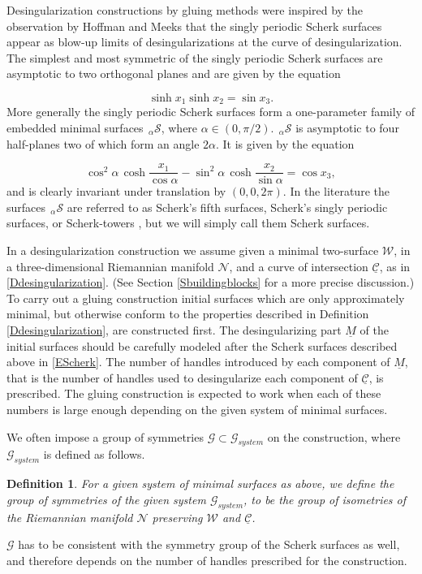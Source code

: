 \documentclass[12pt,namelimits,sumlimits]{amsart}
\newtheorem{definition}[theorem]{Definition}
\theoremstyle{remark}
\numberwithin{equation}{section}
\begin{document}
Desingularization constructions by gluing methods were
inspired by the observation by Hoffman and Meeks \cite{HM4}
that the singly periodic Scherk surfaces \cite{S,DHKW,Ni}
appear as blow-up limits of desingularizations at the curve of desingularization.
The simplest and most symmetric of the singly periodic Scherk surfaces are asymptotic to
two orthogonal planes and are given by the equation
\addtocounter{theorem}{1}
\begin{equation}
\label{EScherkortho}
\sinh x_1 \sinh x_2=\sin x_3.
\end{equation}
More generally the singly periodic Scherk surfaces form 
a one-parameter family of embedded minimal surfaces
${{{}_{\,\alpha\!}\mathcal{S}}}$,
where 
$\alpha\in(0,\pi/2)$.
${{{}_{\,\alpha\!}\mathcal{S}}}$
is asymptotic to four half-planes two of which form an angle $2\alpha$.
It is given \cite{Ni} by the equation 
\addtocounter{theorem}{1}
\begin{equation}
\label{EScherk}
\cos^2\!\alpha\,\cosh\frac {x_1}{\cos\!\alpha}
-
\sin^2\!\alpha\,\cosh\frac {x_2}{\sin\!\alpha}
=\cos x_3,
\end{equation}
and is clearly invariant under translation by $(0,0,2\pi)$.
In the literature the surfaces ${{{}_{\,\alpha\!}\mathcal{S}}}$
are referred to as Scherk's fifth surfaces,
Scherk's singly periodic surfaces,
or Scherk-towers
\cite{Ni,HM4,DHKW,kapouleas:finite}, but
we will simply call them Scherk surfaces.

In a desingularization construction we assume given 
a minimal two-surface ${{\mathcal{W}}}$,
in a three-dimensional Riemannian manifold ${{\mathcal{N}}}$,
and a curve of intersection ${\underline{{\mathcal{C}}}}$,
as in \ref{Ddesingularization}.
(See Section \ref{Sbuildingblocks} for a more precise discussion.)
To carry out a gluing construction initial surfaces which are only approximately minimal,
but otherwise conform to the properties described in Definition \ref{Ddesingularization},
are constructed first.
The desingularizing part $\underline{M}$ of the initial surfaces should be carefully modeled
after the Scherk surfaces described above in \ref{EScherk}.
The number of handles introduced by each component of $\underline{M}$,
that is the number of handles used to desingularize each component of ${\underline{{\mathcal{C}}}}$,
is prescribed.
The gluing construction is expected to work when each of these numbers is large enough
depending on the given system of minimal surfaces.

We often impose a group of symmetries ${{\mathscr{G}}}\subset{{\mathscr{G}_{system}}}$ on the construction,
where ${{\mathscr{G}_{system}}}$ is defined as follows.
\addtocounter{equation}{1}
\begin{definition}
\label{Dgroupsystem}
For a given system of minimal surfaces as above,
we define the group of symmetries of the given system ${{\mathscr{G}_{system}}}$,
to be the group of isometries of the Riemannian manifold ${{\mathcal{N}}}$ preserving ${{\mathcal{W}}}$ and ${\underline{{\mathcal{C}}}}$.
\end{definition}
${{\mathscr{G}}}$ has to be consistent with the symmetry group of the Scherk surfaces as well,
and therefore depends on the number of handles prescribed for the construction.
\end{document}
